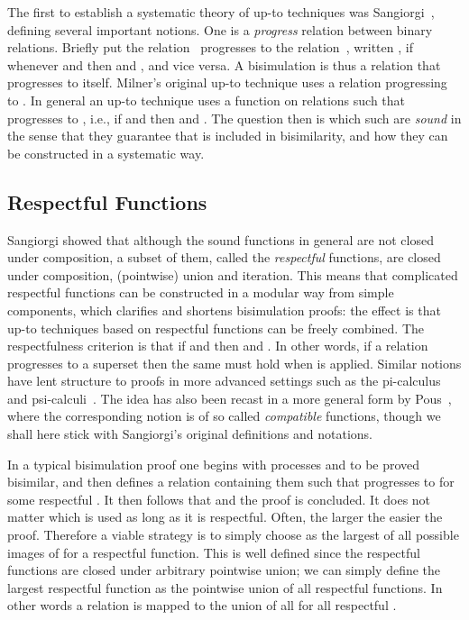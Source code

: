 \documentclass{CSML}
\theoremstyle{definition}
\begin{document}
The first to establish a systematic theory of up-to techniques was
Sangiorgi~\cite{Sangiorgi1994,Sangiorgi1998}, defining several
important notions. One is a {\em progress} relation between binary
relations. Briefly put the relation~ progresses to the
relation~, written , if whenever  and
 then  and , and vice versa. A bisimulation is
thus a relation that progresses to itself. Milner's original up-to
technique uses a relation  progressing to . In general an up-to technique uses a function
 on relations such that  progresses to , i.e., if  and  then  and . The question then is which such  are {\em sound} in the sense
that they guarantee that  is included in bisimilarity, and how they
can be constructed in a systematic way.

\subsection{Respectful Functions}

Sangiorgi showed that although the sound functions in general are not
closed under composition, a subset of them, called the {\em
  respectful} functions, are closed under composition, (pointwise)
union and iteration. This means that complicated respectful functions
can be constructed in a modular way from simple components, which
clarifies and shortens bisimulation proofs: the effect is that up-to
techniques based on respectful functions can be freely combined. The
respectfulness criterion is that if  and 
then  and . In other
words, if a relation progresses to a superset then the same must hold
when  is applied. Similar notions have lent structure to proofs in
more advanced settings such as the pi-calculus~\cite{Hirschkoff1997}
and psi-calculi~\cite{Pohjola2016}. The idea has also been recast in a
more general form by Pous~\cite{Pous2007}, where the corresponding
notion is of so called {\em compatible} functions, though we shall
here stick with Sangiorgi's original definitions and notations.

In a typical bisimulation proof one begins with processes  and 
to be proved bisimilar, and then defines a relation  containing
them such that  progresses to  for some respectful . It
then follows that  and the proof is
concluded. It does not matter which  is used as long as it is
respectful. Often,  the larger  the easier the proof. Therefore
a viable strategy is to simply choose  as the largest of all
possible images of  for a respectful function. This is well defined
since the respectful functions are closed under arbitrary pointwise
union; we can simply define the largest respectful function as the
pointwise union of all respectful functions. In other words a relation
 is mapped to the union of all  for all respectful .
\end{document}
